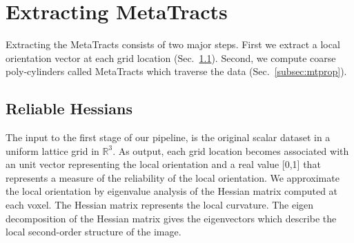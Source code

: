 


\section {Extracting MetaTracts }
\label{sec:approach}
Extracting the MetaTracts consists of two  major steps. First we extract a local orientation vector at each grid location (Sec.~\ref{subsec:rh}). Second, we compute coarse poly-cylinders called MetaTracts which traverse the data (Sec.~\ref{subsec:mtprop}).



\subsection {Reliable Hessians}
\label{subsec:rh}

The input to the first stage of our pipeline, is the original scalar dataset in a uniform lattice grid in $\mathbb{R}^3$. As output, each grid location becomes associated with an unit vector representing the local orientation and a real value [0,1] that represents a measure of the reliability of the local orientation. We approximate the local orientation by eigenvalue analysis of the Hessian matrix computed at each voxel.
The Hessian matrix represents the local curvature. The eigen decomposition of the Hessian matrix gives the eigenvectors which describe the local second-order structure of the image.

